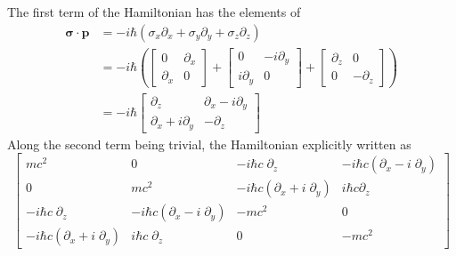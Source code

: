 \documentclass[../../../main.tex]{subfiles}
\begin{document}
The first term of the Hamiltonian has the elements of
\begin{align*}
    \boldsymbol{\sigma}\cdot \hat{\mathbf p}
     & = -i\hbar\left( \sigma_x \partial_x + \sigma_y \partial_y + \sigma_z \partial_z \right) \\
     & = -i\hbar \left(
    \begin{bmatrix}
            0          & \partial_x \\
            \partial_x & 0
        \end{bmatrix}
    +
    \begin{bmatrix}
            0           & -i\partial_y \\
            i\partial_y & 0
        \end{bmatrix}
    +
    \begin{bmatrix}
            \partial_z & 0           \\
            0          & -\partial_z
        \end{bmatrix}
    \right)                                                                                    \\
     & = -i\hbar
    \begin{bmatrix}
        \partial_z               & \partial_x - i\partial_y \\
        \partial_x + i\partial_y & -\partial_z
    \end{bmatrix}
\end{align*}
Along the second term being trivial, the Hamiltonian explicitly written as
\begin{equation*}
    \begin{bmatrix}
        mc^2                                             & 0                                                & -i\hbar c\;\partial_z                            & -i \hbar c \left( \partial_x-i \;\partial_y \right) \\
        0                                                & mc^2                                             & -i\hbar c\left(\partial_x + i\;\partial_y\right) & i\hbar c \partial_z                                 \\
        -i\hbar c\;\partial_z                            & -i\hbar c\left(\partial_x - i\;\partial_y\right) & -mc^2                                            & 0                                                   \\
        -i\hbar c\left(\partial_x + i\;\partial_y\right) & i\hbar c\;\partial_z                             & 0                                                & -mc^2
    \end{bmatrix}
\end{equation*}
\end{document}

